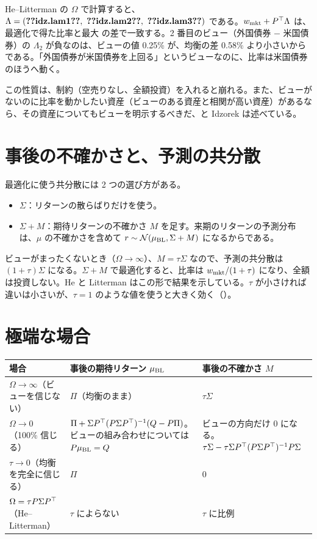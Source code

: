 \begin{exbox}
He--Litterman の $\Omega$ で計算すると、$\Lambda=(\V{idz.lam1},\ \V{idz.lam2},\ \V{idz.lam3})$ である。$w_{\mathrm{mkt}}+P^{\top}\Lambda$ は、最適化で得た比率と最大  の差で一致する。2 番目のビュー（外国債券 $-$ 米国債券）の $\Lambda_2$ が負なのは、ビューの値 0.25\% が、均衡の差 0.58\% より小さいからである。「外国債券が米国債券を上回る」というビューなのに、比率は米国債券のほうへ動く。
\end{exbox}

この性質は、制約（空売りなし、全額投資）を入れると崩れる。また、ビューがないのに比率を動かしたい資産（ビューのある資産と相関が高い資産）があるなら、その資産についてもビューを明示するべきだ、と Idzorek は述べている。

\section{事後の不確かさと、予測の共分散}\label{sec:posterior-cov}

最適化に使う共分散には 2 つの選び方がある。

\begin{itemize}
\item $\Sigma$：リターンの散らばりだけを使う。
\item $\Sigma+M$：期待リターンの不確かさ $M$ を足す。来期のリターンの予測分布は、$\mu$ の不確かさを含めて $r\sim\mathcal N(\mu_{\mathrm{BL}},\Sigma+M)$ になるからである。
\end{itemize}

ビューがまったくないとき（$\Omega\to\infty$）、$M=\tau\Sigma$ なので、予測の共分散は $(1+\tau)\Sigma$ になる。$\Sigma+M$ で最適化すると、比率は $w_{\mathrm{mkt}}/(1+\tau)$ になり、全額は投資しない。He と Litterman はこの形で結果を示している。$\tau$ が小さければ違いは小さいが、$\tau=1$ のような値を使うと大きく効く（）。

\section{極端な場合}

\begin{center}
\small
\begin{tabular}{p{3.0cm}p{5.1cm}p{5.1cm}}
\toprule
場合 & 事後の期待リターン $\mu_{\mathrm{BL}}$ & 事後の不確かさ $M$ \\
\midrule
$\Omega\to\infty$（ビューを信じない） & $\Pi$（均衡のまま） & $\tau\Sigma$ \\
$\Omega\to0$（100\% 信じる） & $\Pi+\Sigma P^{\top}(P\Sigma P^{\top})^{-1}(Q-P\Pi)$。ビューの組み合わせについては $P\mu_{\mathrm{BL}}=Q$ & ビューの方向だけ 0 になる。$\tau\Sigma-\tau\Sigma P^{\top}(P\Sigma P^{\top})^{-1}P\Sigma$ \\
$\tau\to0$（均衡を完全に信じる） & $\Pi$ & 0 \\
$\Omega=\tau P\Sigma P^{\top}$（He--Litterman） & $\tau$ によらない & $\tau$ に比例 \\
\bottomrule
\end{tabular}
\end{center}

